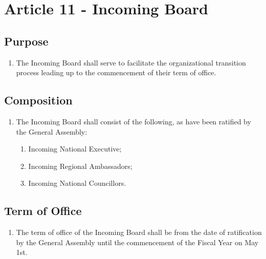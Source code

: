 \section{Article 11 - Incoming Board}
\label{article-11-incoming-board}

\subsection{Purpose}
\label{purpose-incoming-board}

\begin{enumerate}
 \item The Incoming Board shall serve to facilitate the organizational transition process leading up to the commencement of their term of office.
\end{enumerate}

\subsection{Composition}
\label{composition-incoming-board}

\begin{enumerate}
 \item The Incoming Board shall consist of the following, as have been ratified by the General Assembly:
  \begin{enumerate}
   \item Incoming National Executive;
   \item Incoming Regional Ambassadors;
   \item Incoming National Councillors.
  \end{enumerate}
\end{enumerate}

\subsection{Term of Office}
\label{term-of-office-incoming-board}

\begin{enumerate}
 \item The term of office of the Incoming Board shall be from the date of ratification by the General Assembly until the commencement of the Fiscal Year on May 1st.
\end{enumerate}
